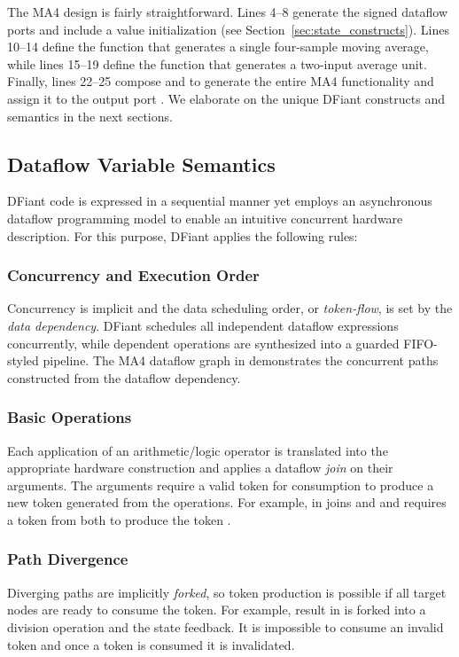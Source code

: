 The MA4 design is fairly straightforward. Lines 4--8 generate the signed dataflow ports and include a  value initialization (see Section~\ref{sec:state_constructs}). 
Lines 10--14 define the function  that generates a single four-sample moving average, while lines 15--19 define the function  that generates a two-input average unit. Finally, lines 22--25 compose  and  to generate the entire MA4 functionality and assign it to the output port . We elaborate on the unique DFiant constructs and semantics in the next sections.


\subsection{Dataflow Variable Semantics}
DFiant code is expressed in a sequential manner yet employs an asynchronous dataflow programming model to enable an intuitive concurrent hardware description. For this purpose, DFiant applies the following rules:

\subsubsection{Concurrency and Execution Order} 
Concurrency is implicit and the data scheduling order, or \textit{token-flow}, is set by the \textit{data dependency}. DFiant schedules all independent dataflow expressions concurrently, while dependent operations are synthesized into a guarded FIFO-styled pipeline. The MA4 dataflow graph in  demonstrates the concurrent paths constructed from the dataflow dependency. 

\subsubsection{Basic Operations} 
\label{sec:basic_ops}
Each application of an arithmetic/logic operator is translated into the appropriate hardware construction and applies a dataflow \emph{join} on their arguments. The arguments require a valid token for consumption to produce a new token generated from the operations. For example, \code{+} in  joins  and  and requires a token from both to produce the token .

\subsubsection{Path Divergence} 
\label{sec:path_div}
Diverging paths are implicitly \emph{forked}, so token production is possible if all target nodes are ready to consume the token. For example,  result in  is forked into a division operation and the state feedback.	It is impossible to consume an invalid token and once a token is consumed it is invalidated.

